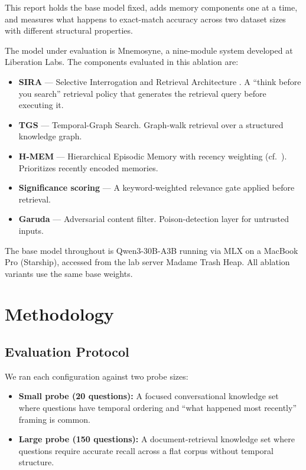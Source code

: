 \documentclass[11pt,a4paper]{article}
\begin{document}
This report holds the base model fixed, adds memory components one at a time, and measures what happens to exact-match accuracy across two dataset sizes with different structural properties.

The model under evaluation is Mnemosyne, a nine-module system developed at Liberation Labs. The components evaluated in this ablation are:

\begin{itemize}
  \item \textbf{SIRA} --- Selective Interrogation and Retrieval Architecture \cite{sira}. A ``think before you search'' retrieval policy that generates the retrieval query before executing it.
  \item \textbf{TGS} --- Temporal-Graph Search. Graph-walk retrieval over a structured knowledge graph.
  \item \textbf{H-MEM} --- Hierarchical Episodic Memory with recency weighting (cf.~\cite{hipporag}). Prioritizes recently encoded memories.
  \item \textbf{Significance scoring} --- A keyword-weighted relevance gate applied before retrieval.
  \item \textbf{Garuda} --- Adversarial content filter. Poison-detection layer for untrusted inputs.
\end{itemize}

The base model throughout is Qwen3-30B-A3B \cite{qwen} running via MLX on a MacBook Pro (Starship), accessed from the lab server Madame Trash Heap. All ablation variants use the same base weights.

\section{Methodology}

\subsection{Evaluation Protocol}

We ran each configuration against two probe sizes:

\begin{itemize}
  \item \textbf{Small probe (20 questions):} A focused conversational knowledge set where questions have temporal ordering and ``what happened most recently'' framing is common.
  \item \textbf{Large probe (150 questions):} A document-retrieval knowledge set where questions require accurate recall across a flat corpus without temporal structure.
\end{itemize}
\end{document}
